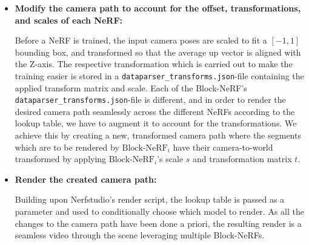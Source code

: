 \begin{itemize}
    \item \textbf{Modify the camera path to account for the offset, transformations, and scales of each NeRF:}
    
    Before a NeRF is trained, the input camera poses are scaled to fit a $[-1, 1]$ bounding box, and transformed so that the average up vector is aligned with the Z-axis. The respective transformation which is carried out to make the training easier is stored in a \texttt{dataparser\_transforms.json}-file containing the applied transform matrix and scale. Each of the Block-NeRF's \texttt{dataparser\_transforms.json}-file is different, and in order to render the desired camera path seamlessly across the different NeRFs according to the lookup table, we have to augment it to account for the transformations. We achieve this by creating a new, transformed camera path where the segments which are to be rendered by $\text{Block-NeRF}_i$ have their camera-to-world transformed by applying $\text{Block-NeRF}_i$'s scale $s$ and transformation matrix $t$. 
    
    \item \textbf{Render the created camera path:}

    Building upon Nerfstudio's render script, the lookup table is passed as a parameter and used to conditionally choose which model to render. As all the changes to the camera path have been done a priori, the resulting render is a seamless video through the scene leveraging multiple Block-NeRFs.
\end{itemize}



